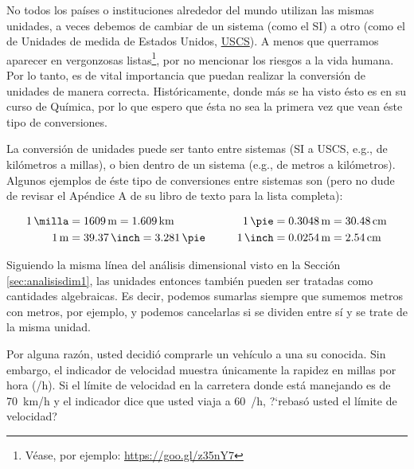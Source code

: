 No todos los pa\'ises o instituciones alrededor del mundo utilizan las mismas unidades, a veces debemos de cambiar de un sistema (como el SI) a otro (como el de Unidades de medida de Estados Unidos, \href{https://es.wikipedia.org/wiki/Unidades_tradicionales_de_Estados_Unidos}{USCS}). A menos que querramos aparecer en vergonzosas listas\footnote{V\'ease, por ejemplo: \url{https://goo.gl/z35nY7}}, por no mencionar los riesgos a la vida humana. Por lo tanto, es de vital importancia que puedan realizar la conversi\'on de unidades de manera correcta. Hist\'oricamente, donde m\'as se ha visto \'esto es en su curso de Qu\'imica, por lo que espero que \'esta no sea la primera vez que vean \'este tipo de conversiones.

La conversi\'on de unidades puede ser tanto entre sistemas (SI a USCS, e.g., de kil\'ometros a millas), o bien dentro de un sistema (e.g., de metros a kil\'ometros). Algunos ejemplos de \'este tipo de conversiones entre sistemas son (pero no dude de revisar el Ap\'endice A de su libro de texto para la lista completa):

\begin{equation*}
\begin{aligned}[c]
\SI{1}{\milla}&=\SI{1609}{\meter} = \SI{1.609}{\kilo\meter}\\
\SI{1}{\meter}&=\SI{39.37}{\inch} = \SI{3.281}{\pie}
\end{aligned}
\hspace{10mm}
\begin{aligned}[c]
\SI{1}{\pie}&=\SI{0.3048}{\meter} = \SI{30.48}{\centi\meter}\\
\SI{1}{\inch} &= \SI{0.0254}{\meter} = \SI{2.54}{\centi\meter} 
\end{aligned}
\end{equation*}

Siguiendo la misma l\'inea del an\'alisis dimensional visto en la Secci\'on \ref{sec:analisisdim1}, las unidades entonces tambi\'en pueden ser tratadas como cantidades algebraicas. Es decir, podemos sumarlas siempre que sumemos metros con metros, por ejemplo, y podemos cancelarlas si se dividen entre s\'i y se trate de la misma unidad.

\begin{ejemplo}
Por alguna raz\'on, usted decidi\'o comprarle un veh\'iculo a una su conocida. Sin embargo, el indicador de velocidad muestra \'unicamente la rapidez en millas por hora (\si{\milla/\hour}). Si el l\'imite de velocidad en la carretera donde est\'a manejando es de \SI{70}{\kilo\meter/\hour} y el indicador dice que usted viaja a \SI{60}{\milla/\hour}, ?`rebas\'o usted el l\'imite de velocidad?
\end{ejemplo}

